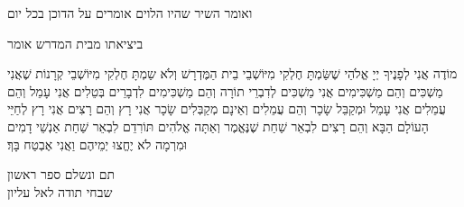 {    {\centering
    {\scriptsize    ואומר השיר שהיו הלוים אומרים על הדוכן בכל יום}
    
      \larger ביציאתו מבית המדרש אומר

    }

\begin{tp}{74}
    מוֹדֶה אֲנִי לְפָנֶיךָ יְיָ אֱלֹהַי שֶׁשַּׂמְתָּ חֶלְקִי מִיּוֹשְׁבֵי בֵית הַמֶּדְרָשׁ וְלֹא שַמְתָּ חֶלְקִי מִיּוֹשְׁבֵי קְרָנוֹת
    שֶׁאֲנִי מַשְׁכִּים וְהֵם מַשְׁכִּימִים אֲנִי מַשְׁכִּים לְדִבְרֵי תוֹרָה וְהֵם מַשְׁכִּימִים לִדְבָרֵים בְּטֵלִים 
    אֲנִי עָמֵל וְהֵם עֲמֵלִים אֲנִי עָמֵל וּמְקַבֵּל שָׂכָר וְהֵם עֲמֵלִים וְאֵינָם מְקַבְּלִים שָׂכָר
    אֲנִי רָץ וְהֵם רָצִים אֲנִי רָץ לְחַיֵּי הָעוֹלָם הַבָּא וְהֵם רָצִים לִבְאֵר שַׁחַת\hdot
    שֶׁנֶּאֱמֶר וְאַתָּה אֱלֹהִים תּוֹרִדֵם לִבְאֵר שַׁחַת אַנְשֵׁי דָמִים וּמִרְמָה לֹא יֶחֱצוּ יְמֵיהֶם וַאֲנִי אֶבְטַח בָּךְ׃
\end{tp}


{\centering
  \LARGE תם ונשלם ספר ראשון\\שבחי תודה לאל עליון
}

}
